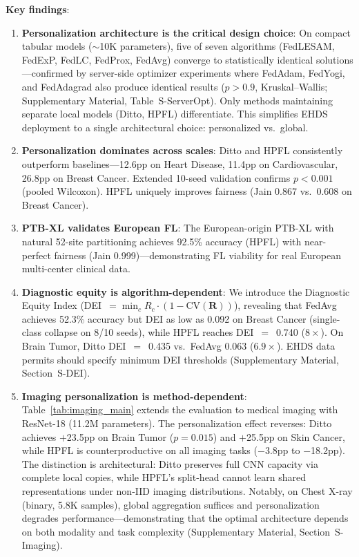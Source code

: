 \documentclass[conference,letterpaper]{IEEEtran}
\begin{document}
\textbf{Key findings}:

\begin{enumerate}
    \item \textbf{Personalization architecture is the critical design choice}: On compact tabular models ($\sim$10K parameters), five of seven algorithms (FedLESAM, FedExP, FedLC, FedProx, FedAvg) converge to statistically identical solutions---confirmed by server-side optimizer experiments where FedAdam, FedYogi, and FedAdagrad also produce identical results ($p{>}0.9$, Kruskal--Wallis; Supplementary Material, Table~S-ServerOpt). Only methods maintaining separate local models (Ditto, HPFL) differentiate. This simplifies EHDS deployment to a single architectural choice: personalized vs.\ global.

    \item \textbf{Personalization dominates across scales}: Ditto and HPFL consistently outperform baselines---12.6pp on Heart Disease, 11.4pp on Cardiovascular, 26.8pp on Breast Cancer. Extended 10-seed validation confirms $p < 0.001$ (pooled Wilcoxon). HPFL uniquely improves fairness (Jain 0.867 vs.\ 0.608 on Breast Cancer).

    \item \textbf{PTB-XL validates European FL}: The European-origin PTB-XL with natural 52-site partitioning achieves 92.5\% accuracy (HPFL) with near-perfect fairness (Jain 0.999)---demonstrating FL viability for real European multi-center clinical data.

    \item \textbf{Diagnostic equity is algorithm-dependent}: We introduce the Diagnostic Equity Index (DEI~$= \min_c R_c \cdot (1 - \text{CV}(\mathbf{R}))$), revealing that FedAvg achieves 52.3\% accuracy but DEI as low as 0.092 on Breast Cancer (single-class collapse on 8/10 seeds), while HPFL reaches DEI~$=$~0.740 ($8\times$). On Brain Tumor, Ditto DEI~$=$~0.435 vs.\ FedAvg 0.063 ($6.9\times$). EHDS data permits should specify minimum DEI thresholds (Supplementary Material, Section~S-DEI).

    \item \textbf{Imaging personalization is method-dependent}: Table~\ref{tab:imaging_main} extends the evaluation to medical imaging with ResNet-18 (11.2M parameters). The personalization effect reverses: Ditto achieves $+$23.5pp on Brain Tumor ($p{=}0.015$) and $+$25.5pp on Skin Cancer, while HPFL is counterproductive on all imaging tasks ($-$3.8pp to $-$18.2pp). The distinction is architectural: Ditto preserves full CNN capacity via complete local copies, while HPFL's split-head cannot learn shared representations under non-IID imaging distributions. Notably, on Chest X-ray (binary, 5.8K samples), global aggregation suffices and personalization degrades performance---demonstrating that the optimal architecture depends on both modality and task complexity (Supplementary Material, Section~S-Imaging).
\end{enumerate}
\end{document}
